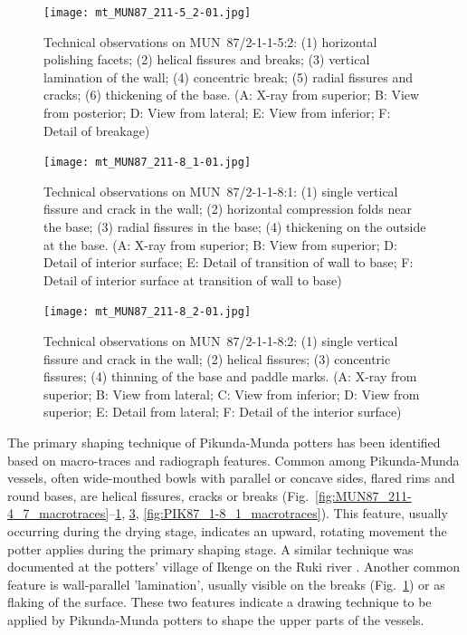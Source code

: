 \documentclass[smallextended,natbib]{svjour3}       %
\begin{document}
\begin{figure}[!tb]
	\texttt{[image: mt\_MUN87\_211-5\_2-01.jpg]}
	\caption{Technical observations on MUN~87/2-1-1-5:2: (1) horizontal polishing facets; (2) helical fissures and breaks; (3) vertical lamination of the wall; (4) concentric break; (5) radial fissures and cracks; (6) thickening of the base. (A: X-ray from superior; B: View from posterior; D: View from lateral; E: View from inferior; F: Detail of breakage)}
	\label{fig:MUN87_211-5_2_macrotraces}
\end{figure}

\begin{figure}[p]
	\centering
	\texttt{[image: mt\_MUN87\_211-8\_1-01.jpg]}
	\caption{Technical observations on MUN~87/2-1-1-8:1: (1) single vertical fissure and crack in the wall; (2) horizontal compression folds near the base; (3) radial fissures in the base; (4) thickening on the outside at the base. (A: X-ray from superior; B: View from superior; D: Detail of interior surface; E: Detail of transition of wall to base; F: Detail of interior surface at transition of wall to base)}
	\label{fig:MUN87_211-8_1_macrotraces}
\end{figure}

\begin{figure}[p]
	\centering
	\texttt{[image: mt\_MUN87\_211-8\_2-01.jpg]}
	\caption{Technical observations on MUN~87/2-1-1-8:2: (1) single vertical fissure and crack in the wall; (2) helical fissures; (3) concentric fissures; (4) thinning of the base and paddle marks. (A: X-ray from superior; B: View from lateral; C: View from inferior; D: View from superior; E: Detail from lateral; F: Detail of the interior surface)}
	\label{fig:MUN87_211-8_2_macrotraces}
\end{figure}

The primary shaping technique of Pikunda-Munda potters has been identified based on macro-traces and radiograph features. Common among Pikunda-Munda vessels, often wide-mouthed bowls with parallel or concave sides, flared rims and round bases, are helical fissures, cracks or breaks (Fig.~\ref{fig:MUN87_211-4_7_macrotraces}--\ref{fig:MUN87_211-5_2_macrotraces}, \ref{fig:MUN87_211-8_2_macrotraces}, \ref{fig:PIK87_1-8_1_macrotraces}). This feature, usually occurring during the drying stage, indicates an upward, rotating movement the potter applies during the primary shaping stage. A similar technique was documented at the potters' village of Ikenge on the Ruki river \citep[Fig.~\ref{fig:map}; ][]{Eggert.1980c}. Another common feature is wall-parallel 'lamination', usually visible on the breaks (Fig.~\ref{fig:MUN87_211-5_2_macrotraces}) or as flaking of the surface. These two features indicate a drawing technique to be applied by Pikunda-Munda potters to shape the upper parts of the vessels.
\end{document}
